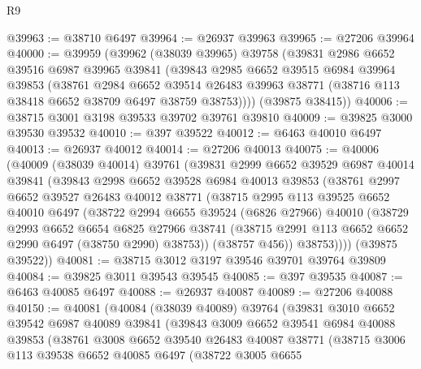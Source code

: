 \begin{lexlean}{R9}
\begin{coremodule}
@39963 := @38710 @6497
@39964 := @26937 @39963
@39965 := @27206 @39964
@40000 := @39959
    (@39962
      (@38039 @39965)
      @39758
      (@39831
        @2986
        @6652
        @39516
        @6987
        @39965
        @39841
        (@39843
          @2985
          @6652
          @39515
          @6984
          @39964
          @39853
          (@38761
            @2984
            @6652
            @39514
            @26483
            @39963
            @38771
            (@38716 @113 @38418 @6652 @38709 @6497 @38759 @38753))))
      (@39875 @38415))
@40006 := @38715 @3001 @3198 @39533 @39702 @39761 @39810
@40009 := @39825 @3000 @39530 @39532
@40010 := @397 @39522
@40012 := @6463 @40010 @6497
@40013 := @26937 @40012
@40014 := @27206 @40013
@40075 := @40006
    (@40009
      (@38039 @40014)
      @39761
      (@39831
        @2999
        @6652
        @39529
        @6987
        @40014
        @39841
        (@39843
          @2998
          @6652
          @39528
          @6984
          @40013
          @39853
          (@38761
            @2997
            @6652
            @39527
            @26483
            @40012
            @38771
            (@38715
              @2995
              @113
              @39525
              @6652
              @40010
              @6497
              (@38722
                @2994
                @6655
                @39524
                (@6826 @27966)
                @40010
                (@38729
                  @2993
                  @6652
                  @6654
                  @6825
                  @27966
                  @38741
                  (@38715 @2991 @113 @6652 @6652 @2990 @6497 (@38750 @2990) @38753))
                (@38757 @456))
              @38753))))
      (@39875 @39522))
@40081 := @38715 @3012 @3197 @39546 @39701 @39764 @39809
@40084 := @39825 @3011 @39543 @39545
@40085 := @397 @39535
@40087 := @6463 @40085 @6497
@40088 := @26937 @40087
@40089 := @27206 @40088
@40150 := @40081
    (@40084
      (@38039 @40089)
      @39764
      (@39831
        @3010
        @6652
        @39542
        @6987
        @40089
        @39841
        (@39843
          @3009
          @6652
          @39541
          @6984
          @40088
          @39853
          (@38761
            @3008
            @6652
            @39540
            @26483
            @40087
            @38771
            (@38715
              @3006
              @113
              @39538
              @6652
              @40085
              @6497
              (@38722
                @3005
                @6655

\end{coremodule}
\end{lexlean}
